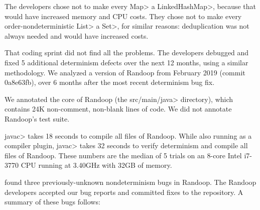The developers chose not to make every \<Map> a \<LinkedHashMap>, because that
would have increased memory and CPU costs.  They chose not to make every
order-nondeterministic \<List> a \<Set>, for similar reasons:  deduplication was
not always needed and would have increased costs.


That coding sprint did not find all the problems.
The developers debugged and fixed 5 additional determinism defects over the
next 12 months, using a similar methodology.
We analyzed a version of Randoop from February 2019 (commit 0a8e63fb), over 6 months after the most recent determinism bug fix.

We annotated the core of Randoop (the \<src/main/java> directory), which
contains 24K non-comment, non-blank lines of code.
We did not annotate Randoop's test suite.

\<javac> takes 18 seconds to compile all files of Randoop.
While also running \theDeterminismChecker as a compiler plugin, \<javac> takes 32 seconds to verify determinism and compile all files of Randoop.
These numbers are the median of 5 trials on an 8-core Intel i7-3770 CPU running at 3.40GHz with 
32GB of memory.




\TheDeterminismChecker found three previously-unknown nondeterminism bugs in Randoop.
The Randoop developers accepted our bug reports and committed fixes to the repository. A summary
of these bugs follows:

